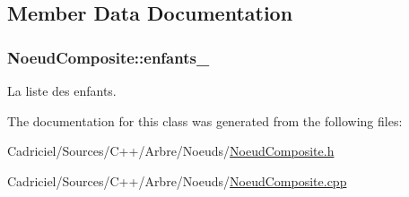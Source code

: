 \subsection{Member Data Documentation}
\hypertarget{class_noeud_composite_a628227fd324020e497ada7577457ff3f}{
\subsubsection[{enfants\-\_\-}]{ Noeud\-Composite\-::enfants\-\_\-\hspace{0.3cm}{\ttfamily [protected]}}}\label{class_noeud_composite_a628227fd324020e497ada7577457ff3f}


La liste des enfants. 



The documentation for this class was generated from the following files\-:\begin{DoxyCompactItemize}
\item 
Cadriciel/\-Sources/\-C++/\-Arbre/\-Noeuds/\hyperlink{_noeud_composite_8h}{Noeud\-Composite.\-h}\item 
Cadriciel/\-Sources/\-C++/\-Arbre/\-Noeuds/\hyperlink{_noeud_composite_8cpp}{Noeud\-Composite.\-cpp}\end{DoxyCompactItemize}
